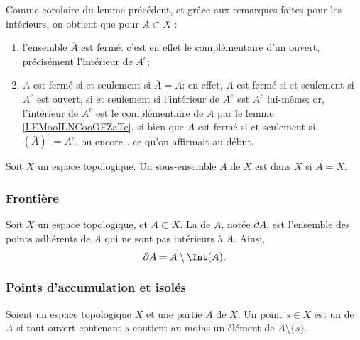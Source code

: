 \begin{remark}\label{RemAdhFerme}
  Comme corolaire du lemme précédent, et grâce aux remarques faites pour les intérieurs, on obtient que pour \( A \subset X \) :
  \begin{enumerate}
  \item l'ensemble \( \bar A \) est fermé: c'est en effet le complémentaire d'un ouvert, précisément l'intérieur de \( A^c \);
  \item \( A \) est fermé si et seulement si \( \bar A = A \): en effet, \( A \) est fermé si et seulement si \( A^c \) est ouvert, si et seulement si l'intérieur de \( A^c \) est \( A^c \) lui-même; or, l'intérieur de \( A^c \) est le complémentaire de \( \bar A \) par le lemme \ref{LEMooILNCooOFZaTe}, si bien que \( A \) est fermé si et seulement si \( (\bar A)^c  = A^c \), ou encore\dots{} ce qu'on affirmait au début.
  \end{enumerate}
\end{remark}

\begin{definition}\label{DefEnsembleDense}
  Soit \( X \) un espace topologique. Un sous-ensemble \( A \) de \( X \) est  dans \( X \) si \( \bar A = X\). 
\end{definition}

\subsubsection{Frontière}

\begin{definition}
  Soit \( X \) un espace topologique, et \( A \subset X \). La  de \( A \), notée \( \partial A \), est l'ensemble des points adhérents de \( A \) qui ne sont pas intérieurs à \( A \). Ainsi,
  \begin{equation}
    \partial A = \bar A \setminus \Int(A).
  \end{equation}
\end{definition}

\subsubsection{Points d'accumulation et isolés}

\begin{definition}      \label{DEFooGHUUooZKTJRi}
    Soient un espace topologique \( X\) et une partie \( A\) de \( X\). Un point \( s\in X \) est un  de \( A\) si tout ouvert contenant \( s\) contient au moins un élément de \( A\setminus\{ s \}\).
\end{definition}

